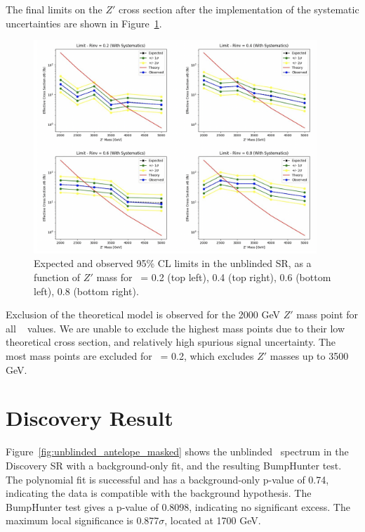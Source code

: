 The final limits on the $Z'$ cross section after the implementation of the systematic uncertainties are shown in Figure~\ref{fig:unblinded_limits_syst}. 
\begin{figure}[!htbp]
\centering
   \includegraphics[width=0.95\textwidth]{figures/results/final_limits}
    \caption{Expected and observed 95\% CL limits in the unblinded SR, as a function of $Z'$ mass for \rinv~= 0.2 (top left), 0.4 (top right), 0.6 (bottom left), 0.8 (bottom right).
    \label{fig:unblinded_limits_syst}}
\end{figure}
Exclusion of the theoretical model is observed for the 2000 GeV $Z'$ mass point for all \rinv~ values.
We are unable to exclude the highest mass points due to their low theoretical cross section, and relatively high spurious signal uncertainty.
The most mass points are excluded for \rinv~= 0.2, which excludes $Z'$ masses up to 3500 GeV.

\clearpage
\section{Discovery Result}
\label{sec:results_svj}
Figure~\ref{fig:unblinded_antelope_masked} shows the unblinded \mt~spectrum in the Discovery SR with a background-only fit, and the resulting BumpHunter test.
The polynomial fit is successful and has a background-only p-value of 0.74, indicating the data is compatible with the background hypothesis. 
The BumpHunter test gives a p-value of 0.8098, indicating no significant excess.
The maximum local significance is 0.877$\sigma$, located at 1700 GeV.

